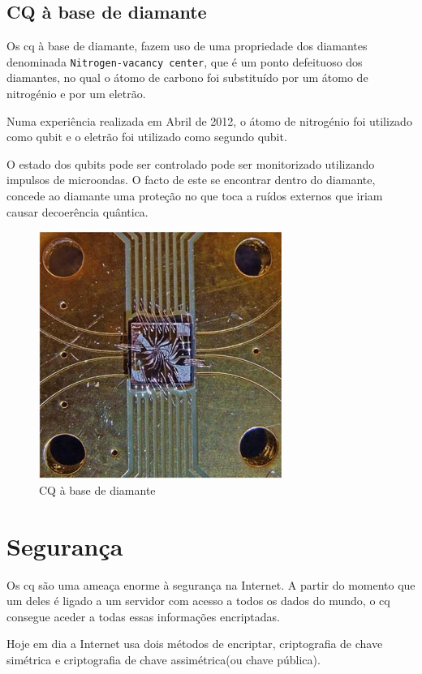 \documentclass{report}
\begin{document}
\clearpage

\section{CQ à base de diamante}

	Os \ac{cq} à base de diamante, fazem uso de uma propriedade dos diamantes denominada \verb|Nitrogen-vacancy center|, que é um ponto defeituoso dos diamantes, no qual o átomo de carbono foi substituído por um átomo de nitrogénio e por um eletrão.

	Numa experiência realizada em Abril de 2012, o átomo de nitrogénio foi utilizado como qubit e o eletrão foi utilizado como segundo qubit.

	O estado dos qubits pode ser controlado pode ser monitorizado utilizando impulsos de microondas. O facto de este se encontrar dentro do diamante, concede ao diamante uma proteção no que toca a ruídos externos que iriam causar decoerência quântica.


\begin{figure}[!h]
	\centering
	\includegraphics[scale=0.5]{diamante.jpg}
	\caption{CQ à base de diamante}
	\label{diamante}
\end{figure}


\chapter{Segurança}
\label{chap.segurança}


	Os \ac{cq} são uma ameaça enorme à segurança na Internet. A partir do momento que um deles é ligado a um servidor com acesso a todos os dados do mundo, o \ac{cq} consegue aceder a todas essas informações encriptadas.
	
	Hoje em dia a Internet usa dois métodos de encriptar, criptografia de chave simétrica e criptografia de chave assimétrica(ou chave pública).
	
\end{document}
